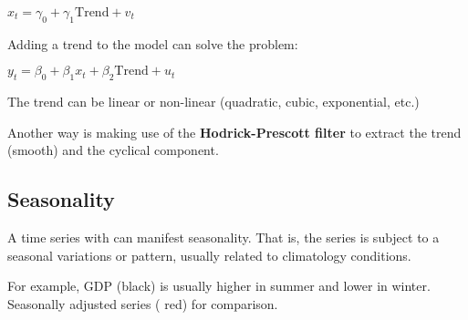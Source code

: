 \documentclass[10pt, a4paper, landscape]{extarticle}
\begin{document}
\begin{multicols}{3}
\begin{center}
	$x_t = \gamma_0 + \gamma_1 \mathrm{Trend} + v_t$
\end{center}

Adding a trend to the model can solve the problem:

\begin{center}
	$y_t = \beta_0 + \beta_1 x_t + \beta_2 \mathrm{Trend} + u_t$
\end{center}

The trend can be linear or non-linear (quadratic, cubic, exponential, etc.)

Another way is making use of the \textbf{Hodrick-Prescott filter} to extract the trend (smooth) and the cyclical component.

\subsection*{Seasonality}

\setlength{\multicolsep}{0pt}
\begin{multicols}{2}

	A time series with can manifest seasonality. That is, the series is subject to a seasonal variations or pattern, usually related to climatology conditions.
	
	For example, GDP (black) is usually higher in summer and lower in winter. Seasonally adjusted series ({\color{red} red}) for comparison.

\columnbreak


\end{multicols}
\end{multicols}
\end{document}
